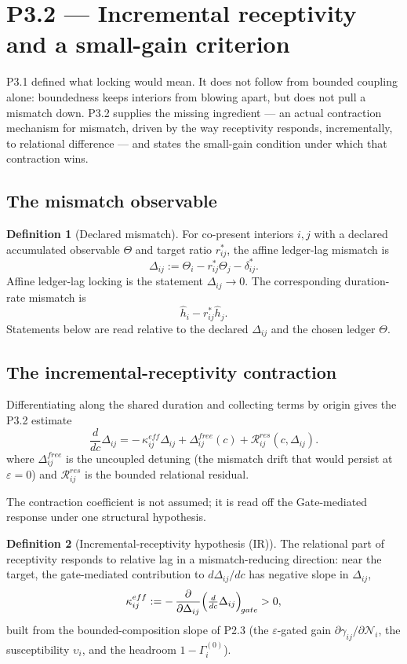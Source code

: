 \documentclass[11pt,a4paper]{article}
\def\mathfrak#1{#1}%
\def\mathrm#1{#1}%
\def\emph#1{#1}%
\theoremstyle{definition}
\newtheorem{definition}{Definition}[section]
\theoremstyle{plain}
\theoremstyle{remark}
\begin{document}
\section{P3.2 --- Incremental receptivity and a small-gain criterion}

P3.1 defined what locking would mean. It does not follow from bounded coupling alone:
boundedness keeps interiors from blowing apart, but does not pull a mismatch down. P3.2
supplies the missing ingredient --- an actual contraction mechanism for mismatch, driven by
the way receptivity responds, incrementally, to relational difference --- and states the
small-gain condition under which that contraction wins.

\subsection{The mismatch observable}

\begin{definition}[Declared mismatch]\label{def:mismatch}
For co-present interiors \(i,j\) with a declared accumulated observable
\(\Theta\) and target ratio \(r^*_{ij}\), the \emph{affine ledger-lag mismatch} is
\[
\Delta_{ij}
:=
\Theta_i-r^*_{ij}\Theta_j-\delta^*_{ij}.
\]
Affine ledger-lag locking is the statement \(\Delta_{ij}\to0\). The corresponding
duration-rate mismatch is
\[
\hat h_i-r^*_{ij}\hat h_j.
\]
Statements below are read relative to the declared \(\Delta_{ij}\) and the chosen
ledger \(\Theta\).
\end{definition}

\subsection{The incremental-receptivity contraction}

Differentiating along the shared duration and collecting terms by origin gives the P3.2
estimate
\[
\boxed{\;
\frac{d}{d\mathfrak c}\Delta_{ij}
=
-\,\kappa^{\mathrm{eff}}_{ij}\Delta_{ij}
+\Delta^{\mathrm{free}}_{ij}(\mathfrak c)
+\mathcal R^{\mathrm{res}}_{ij}(\mathfrak c,\Delta_{ij}).
\;}
\]
where \(\Delta^{\mathrm{free}}_{ij}\) is the uncoupled detuning (the mismatch drift that would
persist at \(\varepsilon=0\)) and \(\mathcal R^{\mathrm{res}}_{ij}\) is the bounded relational
residual.

The contraction coefficient is \emph{not} assumed; it is read off the Gate-mediated
response under one structural hypothesis.

\begin{definition}[Incremental-receptivity hypothesis (IR)]\label{def:IR}
The relational part of receptivity responds to relative lag in a mismatch-reducing
direction: near the target, the gate-mediated contribution to \(d\Delta_{ij}/d\mathfrak c\)
has negative slope in \(\Delta_{ij}\),
\[
\kappa^{\mathrm{eff}}_{ij}
:=
-\,\frac{\partial}{\partial\Delta_{ij}}
\Bigl(\tfrac{d}{d\mathfrak c}\Delta_{ij}\Bigr)_{\!\mathrm{gate}}
>0,
\]
built from the bounded-composition slope of P2.3 (the \(\varepsilon\)-gated gain
\(\partial\gamma_{ij}/\partial\mathcal N_i\), the susceptibility \(\upsilon_i\), and the
headroom \(1-\Gamma_i^{(0)}\)).
\end{definition}
\end{document}
